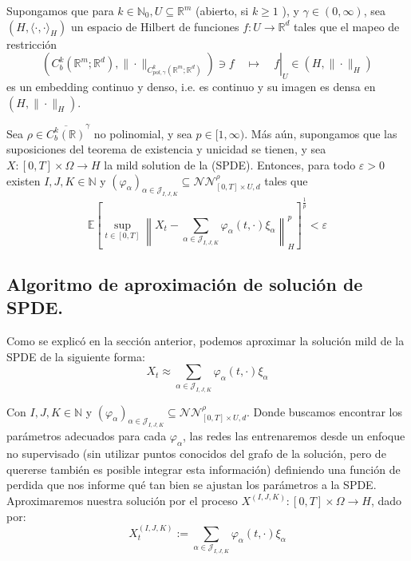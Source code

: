 \begin{teo}[]
  Supongamos que para $k \in \mathbb{N}_0, U \subseteq \mathbb{R}^m$ (abierto, si $k \geqslant 1$ ), y $\gamma \in(0, \infty)$, sea $\left(H,\langle\cdot, \cdot\rangle_H\right)$ un espacio de Hilbert de funciones $f: U \rightarrow \mathbb{R}^d$ tales que el mapeo de restricción
  $$
  \left.\left(C_b^k\left(\mathbb{R}^m ; \mathbb{R}^d\right),\|\cdot\|_{C_{p o l, \gamma}^k\left(\mathbb{R}^m ; \mathbb{R}^d\right)}\right) \ni f \quad \mapsto \quad f\right|_U \in\left(H,\|\cdot\|_H\right)
  $$
  es un embedding continuo y denso, i.e. es continuo y su imagen es densa en $\left(H,\|\cdot\|_H\right)$.

  Sea $\rho \in{\overline{C_b^k(\mathbb{R})}}^\gamma$ no polinomial, y sea $p \in[1, \infty)$. Más aún, supongamos que las suposiciones del teorema de existencia y unicidad se tienen, y sea $X:[0, T] \times \Omega \rightarrow H$ la mild solution de la (SPDE). Entonces, para todo $\varepsilon>0$ existen $I, J, K \in \mathbb{N}$ y $\left(\varphi_\alpha\right)_{\alpha \in \mathcal{J}_{I, J, K}} \subseteq \mathcal{N} \mathcal{N}_{[0, T] \times U, d}^\rho$ tales que
  $$
  \mathbb{E}\left[\sup _{t \in[0, T]}\left\|X_t-\sum_{\alpha \in \mathcal{J}_{I, J, K}} \varphi_\alpha(t, \cdot) \xi_\alpha\right\|_H^p\right]^{\frac{1}{p}}<\varepsilon
  $$
\end{teo}

\subsection{Algoritmo de aproximación de solución de SPDE.}

Como se explicó en la sección anterior, podemos aproximar la solución mild de la SPDE de la siguiente forma:
\[X_t \approx \sum_{\alpha \in \mathcal{J}_{I, J, K}} \varphi_\alpha(t, \cdot) \xi_\alpha\]

Con $I, J, K \in \mathbb{N}$ y $\left(\varphi_\alpha\right)_{\alpha \in \mathcal{J}_{I, J, K}} \subseteq \mathcal{N} \mathcal{N}_{[0, T] \times U, d}^\rho$. Donde buscamos encontrar los parámetros adecuados para cada $\varphi_\alpha$, las redes las entrenaremos desde un enfoque no supervisado (sin utilizar puntos conocidos del grafo de la solución, pero de quererse también es posible integrar esta información) definiendo una función de perdida que nos informe qué tan bien se ajustan los parámetros a la SPDE. Aproximaremos nuestra solución por el proceso $X^{(I,J,K)}: [0,T] \times \Omega \rightarrow H$, dado por:
\[X_t^{(I,J,K)} := \sum_{\alpha \in \mathcal{J}_{I, J, K}} \varphi_\alpha(t, \cdot) \xi_\alpha\]

